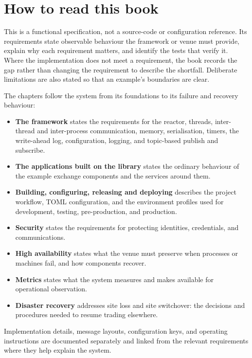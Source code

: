 \section{How to read this book}
\label{sec:introduction:structure}

This is a functional specification, not a source-code or configuration
reference. Its requirements state observable behaviour the framework or venue
must provide, explain why each requirement matters, and identify the tests
that verify it. Where the implementation does not meet a requirement, the
book records the gap rather than changing the requirement to describe the
shortfall. Deliberate limitations are also stated so that an example's
boundaries are clear.

The chapters follow the system from its foundations to its failure and
recovery behaviour:

\begin{itemize}[nosep]
  \item \textbf{The framework} states the requirements for the reactor,
        threads, inter-thread and inter-process communication, memory,
        serialisation, timers, the write-ahead log, configuration, logging,
        and topic-based publish and subscribe.
  \item \textbf{The applications built on the library} states the ordinary
        behaviour of the example exchange components and the services around
        them.
  \item \textbf{Building, configuring, releasing and deploying} describes
        the project workflow, TOML configuration, and the environment
        profiles used for development, testing, pre-production, and production.
  \item \textbf{Security} states the requirements for protecting identities,
        credentials, and communications.
  \item \textbf{High availability} states what the venue must preserve when
        processes or machines fail, and how components recover.
  \item \textbf{Metrics} states what the system measures and makes available
        for operational observation.
  \item \textbf{Disaster recovery} addresses site loss and site switchover:
        the decisions and procedures needed to resume trading elsewhere.
\end{itemize}

Implementation details, message layouts, configuration keys, and operating
instructions are documented separately and linked from the relevant
requirements where they help explain the system.
